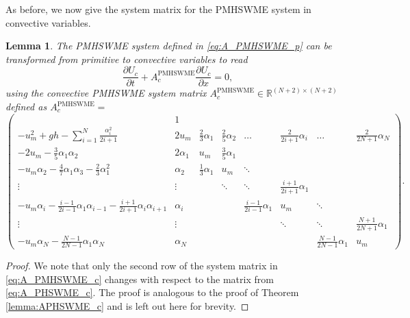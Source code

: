 \documentclass[a4paper, 11pt]{article}
\newtheorem{lemma}{Lemma}
\begin{document}
As before, we now give the system matrix for the PMHSWME system in convective variables.
\begin{lemma}\label{lemma:APMHSWME_c}
    The PMHSWME system defined in \eqref{eq:A_PMHSWME_p} can be transformed from primitive to convective variables to read
    \begin{equation}\label{eq:PMHSWME_c}
        \frac{\partial U_{c}}{\partial t} + A^{\textrm{PMHSWME}}_{c} \frac{\partial U_{c}}{\partial x} = 0,
    \end{equation}
    using the convective PMHSWME system matrix $A^{\textrm{PMHSWME}}_{c} \in \mathbb{R}^{(N+2)\times(N+2)}$ defined as $A^{\textrm{PMHSWME}}_{c}=$
    \begin{equation}\label{eq:A_PMHSWME_c}
        \left(\begin{array}{cccccccc}
          & 1 &  &  &  &  &  &  \\
        -u_m^2 + gh - \sum\limits_{i=1}^N \frac{\alpha_i^2}{2i+1} & 2u_m & \frac{2}{3} \alpha_1 & \frac{2}{5} \alpha_2 & \dots & \frac{2}{2i+1} \alpha_i & \dots & \frac{2}{2N+1} \alpha_N \\
        -2u_m - \frac{3}{5}\alpha_1\alpha_2 & 2\alpha_1 & u_m & \frac{3}{5} \alpha_1 & &&  &  \\
        -u_m \alpha_2 - \frac{4}{7}\alpha_1\alpha_3 - \frac{2}{3}\alpha_1^2 & \alpha_2 & \frac{1}{3}\alpha_1 & u_m & \ddots & &  &  \\
        \vdots & \vdots &  & \ddots & \ddots & \frac{i+1}{2i+1}\alpha_1 &  &   \\
        -u_m \alpha_i- \frac{i-1}{2i-1}\alpha_1\alpha_{i-1} - \frac{i+1}{2i+1}\alpha_i \alpha_{i+1}&  \alpha_i &  &  & \frac{i-1}{2i-1}\alpha_1 & u_m & \ddots &  \\
        \vdots & \vdots &  &  &  & \ddots & \ddots &  \frac{N+1}{2N+1}\alpha_1 \\
        -u_m \alpha_N - \frac{N-1}{2N-1} \alpha_1 \alpha_N & \alpha_N &  &  &  &  &  \frac{N-1}{2N-1}\alpha_1 & u_m
        \end{array}\right).
    \end{equation}
\end{lemma}
\begin{proof}
    We note that only the second row of the system matrix in \eqref{eq:A_PMHSWME_c} changes with respect to the matrix from \eqref{eq:A_PHSWME_c}.
    The proof is analogous to the proof of Theorem \ref{lemma:APHSWME_c} and is left out here for brevity.
\end{proof}
\end{document}

